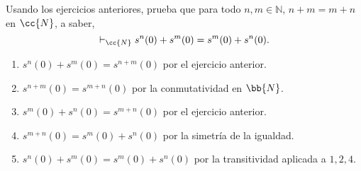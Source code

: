 \begin{ejercicio}
    Usando los ejercicios anteriores, prueba que para todo $n, m \in \mathbb{N}$, $n + m = m + n$ en $\cc{N}$, a saber,
    \[
        \vdash_{\cc{N}} s^n(0) + s^m(0) = s^m(0) + s^n(0).
    \]
    \begin{enumerate}
        \item $s^n(0) + s^m(0)=s^{n+m}(0)$ por el ejercicio anterior.
        \item $s^{n+m}(0)=s^{m+n}(0)$ por la conmutatividad en $\bb{N}$.
        \item $s^m(0) + s^n(0)=s^{m+n}(0)$ por el ejercicio anterior.
        \item $s^{m+n}(0)=s^m(0) + s^n(0)$ por la simetría de la igualdad.
        \item $s^n(0) + s^m(0)=s^m(0) + s^n(0)$ por la transitividad aplicada a $1,2,4$.
    \end{enumerate}
\end{ejercicio}
\begin{comment}




Ejercicio 1. En un sistema de primer orden con igualdad, demuestra que las siguientes formulas son teoremas. ´
1. ∀x(x = x).
2. ∀x∀y(x = y → y = x).
3. ∀x∀y∀z(x = y → (y = z → x = z)).
Ejercicio 2. Sean n, m ∈ N. En la aritmetica de primer orden ´ N prueba que
1. si n , m, entonces `N ¬(s
n
(0) = s
m(0)),
2. si n = m, entonces `N (s
n
(0) = s
m(0)),
3. `N (s
n
(0) + s
m(0) = s
n+m(0)).
Ejercicio 3. Usando los ejercicios anteriores, prueba que para todo n, m ∈ N, n+m =
m + n en N, a saber,
`N s
n
(0) + s
m
(0) = s
m
(0) + s
n
(0).
\end{comment}